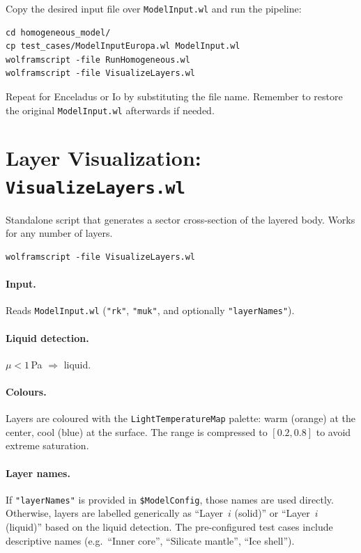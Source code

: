 \documentclass[11pt]{article}
\begin{document}
Copy the desired input file over \texttt{ModelInput.wl} and run the
pipeline:

\begin{lstlisting}[style=shell]
cd homogeneous_model/
cp test_cases/ModelInputEuropa.wl ModelInput.wl
wolframscript -file RunHomogeneous.wl
wolframscript -file VisualizeLayers.wl
\end{lstlisting}

Repeat for Enceladus or Io by substituting the file name.  Remember to
restore the original \texttt{ModelInput.wl} afterwards if needed.

\section{Layer Visualization: \texttt{VisualizeLayers.wl}}
\label{sec:vis}

Standalone script that generates a sector cross-section of the layered
body.  Works for any number of layers.

\begin{lstlisting}[style=shell]
wolframscript -file VisualizeLayers.wl
\end{lstlisting}

\paragraph{Input.}
Reads \texttt{ModelInput.wl} (\texttt{"rk"}, \texttt{"muk"}, and
optionally \texttt{"layerNames"}).

\paragraph{Liquid detection.}
$\mu < 1$\,Pa $\Rightarrow$ liquid.

\paragraph{Colours.}
Layers are coloured with the \texttt{LightTemperatureMap} palette: warm
(orange) at the center, cool (blue) at the surface.  The range is
compressed to $[0.2, 0.8]$ to avoid extreme saturation.

\paragraph{Layer names.}
If \texttt{"layerNames"} is provided in \texttt{\$ModelConfig}, those
names are used directly.  Otherwise, layers are labelled generically as
``Layer~$i$ (solid)'' or ``Layer~$i$ (liquid)'' based on the liquid
detection.  The pre-configured test cases include descriptive names
(e.g.\ ``Inner core'', ``Silicate mantle'', ``Ice shell'').
\end{document}
